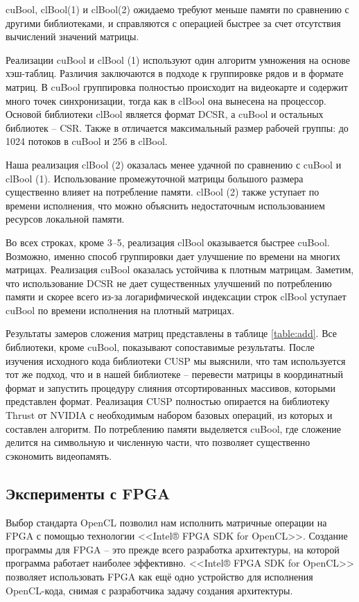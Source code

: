 \documentclass[14pt]{extarticle}
\newcommand{\sectionbreak}{\clearpage}
\begin{document}
	cuBool, clBool(1) и clBool(2) ожидаемо требуют меньше памяти по сравнению с  другими библиотеками, и справляются с операцией быстрее за счет отсутствия вычислений значений матрицы.
	
	Реализации cuBool и clBool (1) используют один алгоритм умножения на основе хэш-таблиц. Различия заключаются в подходе к группировке рядов и в формате матриц. В cuBool группировка полностью происходит на видеокарте и содержит много точек синхронизации, тогда как в clBool она вынесена на процессор. Основой библиотеки clBool является формат DCSR, а cuBool и остальных библиотек -- CSR. Также в отличается максимальный размер рабочей группы: до 1024 потоков в cuBool и 256 в clBool.  
	
	Наша реализация clBool (2) оказалась менее удачной по сравнению с cuBool и clBool (1). Использование промежуточной матрицы большого размера существенно влияет на потребление памяти. clBool (2) также уступает по времени исполнения, что можно объяснить недостаточным использованием ресурсов локальной памяти. 
	
	Во всех строках, кроме 3--5, реализация clBool оказывается быстрее cuBool. Возможно, именно способ группировки дает улучшение по времени на многих матрицах. Реализация cuBool оказалась устойчива к плотным матрицам. Заметим, что использование DCSR не дает существенных улучшений по потреблению памяти и скорее всего из-за логарифмической индексации строк clBool уступает cuBool по времени исполнения на плотный матрицах.
	
	Результаты замеров сложения матриц представлены в таблице \ref{table:add}. Все библиотеки, кроме cuBool, показывают сопоставимые результаты. После изучения исходного кода библиотеки CUSP мы выяснили, что там используется тот же подход, что и в нашей библиотеке -- перевести матрицы в координатный формат и запустить процедуру слияния отсортированных массивов, которыми представлен формат.  Реализация CUSP полностью опирается на библиотеку Thrust от NVIDIA с необходимым набором базовых операций, из которых и составлен алгоритм. 
	По потреблению памяти выделяется cuBool, где сложение делится на символьную и численную части, что позволяет существенно сэкономить видеопамять.
	
	
\sectionbreak


\subsection{Эксперименты с FPGA}

	Выбор стандарта OpenCL позволил нам исполнить матричные операции на FPGA с помощью технологии <<Intel® FPGA SDK for OpenCL>>. Создание программы для FPGA -- это прежде всего разработка архитектуры, на которой программа работает наиболее эффективно. <<Intel® FPGA SDK for OpenCL>> позволяет использовать FPGA как ещё одно устройство для исполнения OpenCL-кода, снимая с разработчика задачу создания архитектуры. 
	
\end{document}
